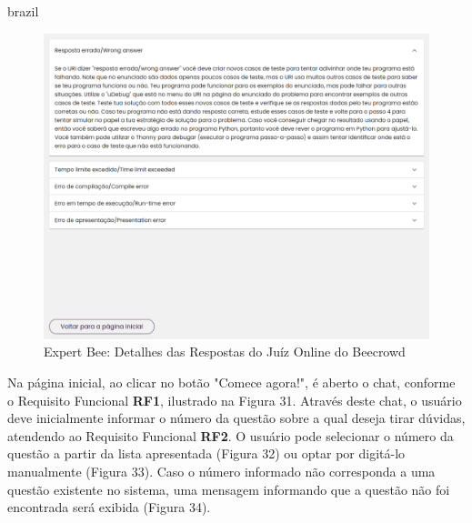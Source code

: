 \begin{otherlanguage*}{brazil}
\begin{figure}[H]
    \centering
            \caption{Expert Bee: Detalhes das Respostas do Juíz Online do Beecrowd}
            \label{fig:ModeloConceitual}
        \includegraphics[scale=0.41]{pictures/desenvolvimento/expert_bee_detalhes_respostas.png}
\end{figure}

Na página inicial, ao clicar no botão "Comece agora!", é aberto o chat, conforme o Requisito Funcional \textbf{RF1}, ilustrado na Figura 31. Através deste chat, o usuário deve inicialmente informar o número da questão sobre a qual deseja tirar dúvidas, atendendo ao Requisito Funcional \textbf{RF2}. O usuário pode selecionar o número da questão a partir da lista apresentada (Figura 32) ou optar por digitá-lo manualmente (Figura 33). Caso o número informado não corresponda a uma questão existente no sistema, uma mensagem informando que a questão não foi encontrada será exibida (Figura 34).


\end{otherlanguage*}
